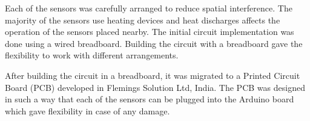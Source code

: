  Each of the sensors was carefully arranged to reduce spatial interference. The majority of the sensors use heating devices and heat discharges affects the operation of the sensors placed nearby. The initial circuit implementation was done using a wired breadboard. Building the circuit with a breadboard gave the flexibility to work with different arrangements.

After building the circuit in a breadboard, it was migrated to a Printed Circuit Board (PCB) developed in Flemings Solution Ltd, India. The PCB was designed in such a way that each of the sensors can be plugged into the Arduino board which gave flexibility in case of any damage. 

